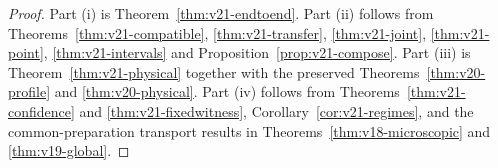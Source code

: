 \begin{proof}
Part (i) is Theorem~\ref{thm:v21-endtoend}. Part (ii) follows from
Theorems~\ref{thm:v21-compatible}, \ref{thm:v21-transfer},
\ref{thm:v21-joint}, \ref{thm:v21-point}, \ref{thm:v21-intervals} and
Proposition~\ref{prop:v21-compose}. Part (iii) is
Theorem~\ref{thm:v21-physical} together with the preserved
Theorems~\ref{thm:v20-profile} and \ref{thm:v20-physical}. Part (iv)
follows from Theorems~\ref{thm:v21-confidence} and
\ref{thm:v21-fixedwitness}, Corollary~\ref{cor:v21-regimes}, and the
common-preparation transport results in
Theorems~\ref{thm:v18-microscopic} and \ref{thm:v19-global}.
\end{proof}
